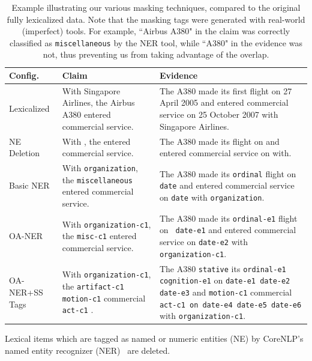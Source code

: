 \begin{table}[t]
\begin{center}
\begin{tabular}{p{20mm}|p{55mm}|p{70mm}}

\textbf{Config.} & \textbf{Claim}& \textbf{Evidence} \\ \hline
Lexicalized & {With Singapore Airlines, the Airbus A380 entered commercial service.} & {The A380 made its first flight on 27 April 2005 and entered commercial service on 25 October 2007 with Singapore Airlines.}\\
\hline
NE Deletion & {With  , the  entered commercial service.} & {The A380 made its  flight on  and entered commercial service on  with.}\\
\hline
Basic NER  & {With \texttt{organization}, the \texttt{miscellaneous} entered commercial service.} & {The A380 made its \texttt{ordinal} flight on \texttt{date} and entered commercial service on \texttt{date} with \texttt{organization}.}\\
\hline
OA-NER  & {With \texttt{organization-c1}, the \texttt{misc-c1} entered commercial service.} & {The A380 made its \texttt{ordinal-e1} flight on \texttt{ date-e1} and entered commercial service on \texttt{date-e2} with \texttt{organization-c1}.}\\
\hline

\mbox{OA-NER+SS} Tags & {With \texttt{organization-c1}, the \texttt{artifact-c1} \texttt{motion-c1} commercial \texttt{act-c1} .} & {The A380 \texttt{stative} its \texttt{ordinal-e1 cognition-e1} on \texttt{date-e1 date-e2 date-e3} and \texttt{motion-c1} commercial \texttt{act-c1 on date-e4 date-e5 date-e6} with \texttt{organization-c1}.
}\\

\end{tabular}
\end{center}

    \caption{ Example illustrating our various masking techniques, compared to the original fully lexicalized data. Note that the masking tags were generated with real-world (imperfect) tools. For example, ``Airbus A380" in the claim was correctly classified as \texttt{miscellaneous} by the NER tool, while ``A380" in the evidence was not, thus preventing us from taking advantage of the overlap. }
    \label{masking_examples}
\end{table}

{}
Lexical items which are tagged as named or numeric entities (NE) by CoreNLP's named entity recognizer (NER)~\citep{manning2014stanford} are deleted.

